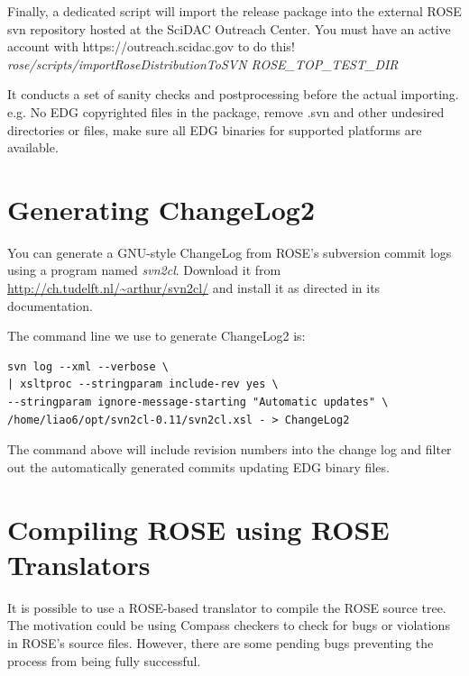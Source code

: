Finally, a dedicated script will import the release package into the
external ROSE svn repository hosted at the SciDAC Outreach Center. You must
have an active account with https://outreach.scidac.gov to do this!\\

\textit{rose/scripts/importRoseDistributionToSVN ROSE\_TOP\_TEST\_DIR}

It conducts a set of sanity checks and postprocessing before the actual importing. e.g. No EDG copyrighted files in the package, remove .svn and other undesired directories or files, make sure all EDG binaries for supported platforms are available.

\section{Generating ChangeLog2}%

You can generate a GNU-style ChangeLog from ROSE's subversion commit logs using a program named \textit{svn2cl}. 
Download it from \url{http://ch.tudelft.nl/~arthur/svn2cl/}
and install it as directed in its documentation. 

The command line we use to generate ChangeLog2 is:
\begin{verbatim}
svn log --xml --verbose \
| xsltproc --stringparam include-rev yes \
--stringparam ignore-message-starting "Automatic updates" \
/home/liao6/opt/svn2cl-0.11/svn2cl.xsl - > ChangeLog2
\end{verbatim}
The command above will include revision numbers into the change log and
filter out the automatically generated commits updating EDG binary files.


\section{Compiling ROSE using ROSE Translators}%
It is possible to use a ROSE-based translator to compile the ROSE source
tree.
The motivation could be using Compass checkers to check for bugs or
violations in ROSE's source files. 
However, there are some pending bugs preventing the process from being fully successful.  


